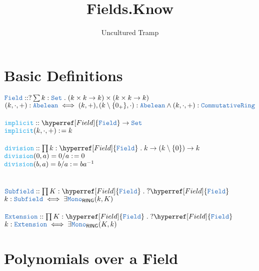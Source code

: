 \documentclass[12pt]{article}
\author{Uncultured Tramp}
\title{Fields.Know}
\newcommand{\TYPE}[1]{\textcolor{NavyBlue}{\mathtt{#1}}}
\newcommand{\FUNC}[1]{\textcolor{Cerulean}{\mathtt{#1}}}
\renewcommand{\.}{\; . \;}
\newcommand{\de}{: \kern 0.1pc =}
\newcommand{\Set}{\TYPE{Set}}
\newcommand{\Abel}{\TYPE{Abelean}}
\newcommand{\RING}{\mathsf{RING}}
\newcommand{\CR}{\TYPE{CommutativeRing}}
\newcommand{\Field}{\hyperref[Field]{\TYPE{Field}}}
\begin{document}
\maketitle
\tableofcontents
\newpage
\section{Basic Definitions}
$\TYPE{Field} :: ?\sum k : \Set \. ( k \times k \to k) \times (k \times k \to k)$ \\
$(k,\cdot,+) : \Abel \iff (k,+),(k \setminus \{ 0_+ \} ,\cdot) : \Abel \wedge ( k,\cdot,+) : \CR  
\label{Field}$
\\ \\
$\FUNC{implicit} :: \Field \to \Set $\\
$\FUNC{implicit}(k,\cdot,+) \de k $ 
\\ \\
$\FUNC{division} :: \prod k : \Field \. k \to (k \setminus \{0\}) \to k$ \\
$\FUNC{division}(0,a)  =0/a \de 0$ \\
$\FUNC{division}(b,a)  = b/a \de ba^{-1}  $ \\ 
\\ \\
$\TYPE{Subfield} :: \prod K : \Field \. ?\Field $ \\
$ k : \TYPE{Subfield}  \iff \exists \TYPE{Mono}_{\RING}(k,K) 
\label{Subfield}
$
\\ \\
$\TYPE{Extension} :: \prod K : \Field \. ?\Field $ \\
$ k : \TYPE{Extension}  \iff \exists \TYPE{Mono}_{\RING}(K,k) 
\label{Superfield}
$

\newpage
\section{Polynomials over a Field}
\end{document}
